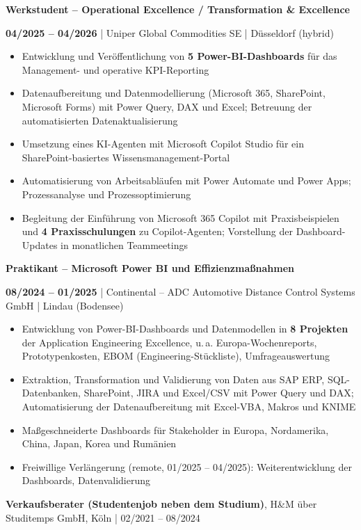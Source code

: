 \documentclass[10pt,a4paper]{article}
\newcommand{\role}[4]{%
  \vspace{0.22em}%
  {\bfseries #1}\par
  {\color{accent}\bfseries #2} | {\color{accent}#3} | {\color{muted}#4}\par}
\begin{document}
\role{Werkstudent – Operational Excellence / Transformation \& Excellence}{04/2025 – 04/2026}
     {Uniper Global Commodities SE}{Düsseldorf (hybrid)}
\begin{itemize}
  \item Entwicklung und Veröffentlichung von \textbf{5 Power-BI-Dashboards} für das Management- und operative KPI-Reporting
  \item Datenaufbereitung und Datenmodellierung (Microsoft 365, SharePoint, Microsoft Forms) mit Power Query, DAX und Excel; Betreuung der automatisierten Datenaktualisierung
  \item Umsetzung eines KI-Agenten mit Microsoft Copilot Studio für ein SharePoint-basiertes Wissensmanagement-Portal
  \item Automatisierung von Arbeitsabläufen mit Power Automate und Power Apps; Prozessanalyse und Prozessoptimierung
  \item Begleitung der Einführung von Microsoft 365 Copilot mit Praxisbeispielen und \textbf{4 Praxisschulungen} zu Copilot-Agenten; Vorstellung der Dashboard-Updates in monatlichen Teammeetings
\end{itemize}

\role{Praktikant – Microsoft Power BI und Effizienzmaßnahmen}{08/2024 – 01/2025}
     {Continental – ADC Automotive Distance Control Systems GmbH}{Lindau (Bodensee)}
\begin{itemize}
  \item Entwicklung von Power-BI-Dashboards und Datenmodellen in \textbf{8 Projekten} der Application Engineering Excellence, u.\,a. Europa-Wochenreports, Prototypenkosten, EBOM (Engineering-Stückliste), Umfrageauswertung
  \item Extraktion, Transformation und Validierung von Daten aus SAP ERP, SQL-Datenbanken, SharePoint, JIRA und Excel/CSV mit Power Query und DAX; Automatisierung der Datenaufbereitung mit Excel-VBA, Makros und KNIME
  \item Maßgeschneiderte Dashboards für Stakeholder in Europa, Nordamerika, China, Japan, Korea und Rumänien
  \item Freiwillige Verlängerung (remote, 01/2025 – 04/2025): Weiterentwicklung der Dashboards, Datenvalidierung
\end{itemize}

\vspace{0.22em}%
{\bfseries Verkaufsberater (Studentenjob neben dem Studium)}, {\color{accent}H\&M über Studitemps GmbH}, Köln | {\color{muted}02/2021 – 08/2024}\par
\end{document}

